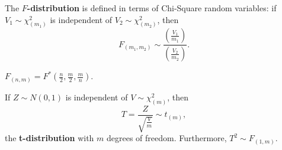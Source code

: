\begin{enumerate}[a)]
    \begin{definition}[F-distribution]
    The \textbf{$F$-distribution} is defined in terms of Chi-Square random variables: if $V_1 \sim \chi_(m_1)^2$ is independent of  $V_2 \sim \chi_(m_2)^2$, then
    \[
        F_{(m_1, m_2)} \sim \frac{\left( \frac{V_1}{m_1} \right) }{\left( \frac{V_2}{m_2} \right)}.
    \]
    \end{definition}

    \begin{remark}
    $F_{(n, m)} = F^*\left( \frac{n}{2}, \frac{m}{2}, \frac{m}{n} \right)$.
    \end{remark}

    \begin{definition}
    If $Z \sim N(0, 1)$ is independent of $V \sim \chi_{(m)}^2$, then 
    \[
        T = \frac{Z}{\sqrt{\frac{V}{m}} } \sim t_(m),
    \]
    the \textbf{t-distribution} with $m$ degrees of freedom. Furthermore, $T^2 \sim F_{(1, m)}$. 
    \end{definition}

\end{enumerate}

